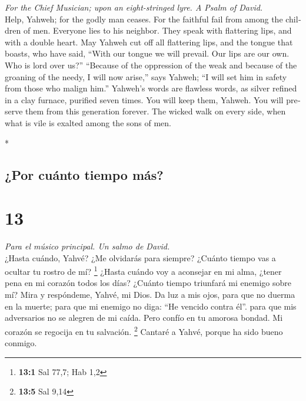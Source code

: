 \begin{paracol}{2}
\begin{otherlanguage}{english}
\emph{For the Chief Musician; upon an eight-stringed lyre. A Psalm of
David.}\\
 Help, Yahweh; for the godly man ceases. For the faithful
fail from among the children of men.  Everyone lies to his
neighbor. They speak with flattering lips, and with a double heart.
 May Yahweh cut off all flattering lips, and the tongue
that boasts,  who have said, ``With our tongue we will
prevail. Our lips are our own. Who is lord over us?'' 
``Because of the oppression of the weak and because of the groaning of
the needy, I will now arise,'' says Yahweh; ``I will set him in safety
from those who malign him.''  Yahweh's words are flawless
words, as silver refined in a clay furnace, purified seven times.
 You will keep them, Yahweh. You will preserve them from
this generation forever.  The wicked walk on every side,
when what is vile is exalted among the sons of men.

\end{otherlanguage}

\switchcolumn[0]*

\hypertarget{por-cuuxe1nto-tiempo-muxe1s}{%
\subsection{¿Por cuánto tiempo más?}\label{por-cuuxe1nto-tiempo-muxe1s}}

\hypertarget{section-24}{%
\section{13}\label{section-24}}

\emph{Para el músico principal. Un salmo de David.}\\
 ¿Hasta cuándo, Yahvé? ¿Me olvidarás para siempre? ¿Cuánto
tiempo vas a ocultar tu rostro de mí? \footnote{\textbf{13:1} Sal 77,7;
  Hab 1,2}  ¿Hasta cuándo voy a aconsejar en mi alma,
¿tener pena en mi corazón todos los días? ¿Cuánto tiempo triunfará mi
enemigo sobre mí?  Mira y respóndeme, Yahvé, mi Dios. Da
luz a mis ojos, para que no duerma en la muerte;  para que
mi enemigo no diga: ``He vencido contra él''. para que mis adversarios
no se alegren de mi caída.  Pero confío en tu amorosa
bondad. Mi corazón se regocija en tu salvación. \footnote{\textbf{13:5}
  Sal 9,14}  Cantaré a Yahvé, porque ha sido bueno
conmigo.


\end{paracol}
